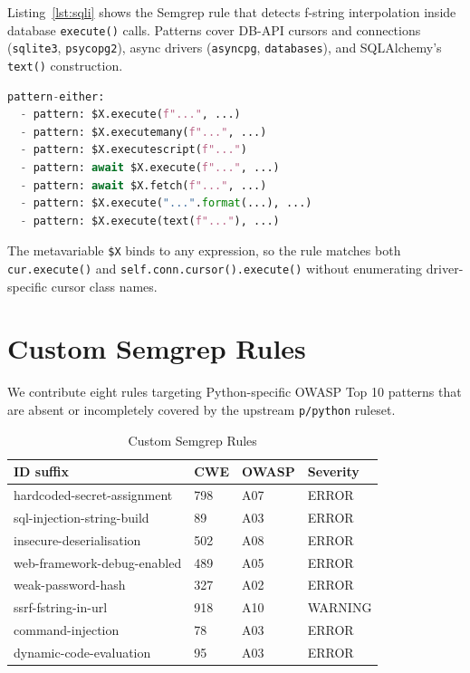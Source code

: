 \documentclass[conference]{IEEEtran}
\begin{document}
Listing~\ref{lst:sqli} shows the Semgrep rule that detects f-string
interpolation inside database \texttt{execute()} calls. Patterns cover
DB-API cursors and connections (\texttt{sqlite3}, \texttt{psycopg2}),
async drivers (\texttt{asyncpg}, \texttt{databases}), and SQLAlchemy's
\texttt{text()} construction.

\begin{lstlisting}[language=Python, caption={ali-sql-injection-string-build patterns (excerpt)}, label={lst:sqli}]
pattern-either:
  - pattern: $X.execute(f"...", ...)
  - pattern: $X.executemany(f"...", ...)
  - pattern: $X.executescript(f"...")
  - pattern: await $X.execute(f"...", ...)
  - pattern: await $X.fetch(f"...", ...)
  - pattern: $X.execute("...".format(...), ...)
  - pattern: $X.execute(text(f"..."), ...)
\end{lstlisting}

The metavariable \texttt{\$X} binds to any expression, so the rule matches
both \texttt{cur.execute()} and \texttt{self.conn.cursor().execute()}
without enumerating driver-specific cursor class names.

\section{Custom Semgrep Rules}
\label{sec:rules}

We contribute eight rules targeting Python-specific OWASP Top 10 patterns
that are absent or incompletely covered by the upstream \texttt{p/python}
ruleset.

\begin{table}[h]
\caption{Custom Semgrep Rules}
\label{tab:rules}
\centering
\begin{tabular}{@{}llll@{}}
\toprule
ID suffix & CWE & OWASP & Severity \\
\midrule
hardcoded-secret-assignment   & 798 & A07 & ERROR   \\
sql-injection-string-build    & 89  & A03 & ERROR   \\
insecure-deserialisation      & 502 & A08 & ERROR   \\
web-framework-debug-enabled   & 489 & A05 & ERROR   \\
weak-password-hash            & 327 & A02 & ERROR   \\
ssrf-fstring-in-url           & 918 & A10 & WARNING \\
command-injection             & 78  & A03 & ERROR   \\
dynamic-code-evaluation       & 95  & A03 & ERROR   \\
\bottomrule
\end{tabular}
\end{table}
\end{document}
